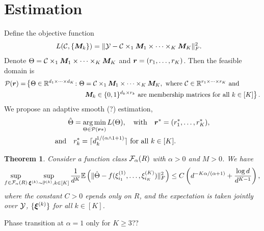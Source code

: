 \documentclass[11pt]{article}
\theoremstyle{plain}
\newtheorem{thm}{Theorem}[section]
\theoremstyle{definition}
\begin{document}
\section{Estimation}
Define the objective function
\begin{align}
L(\mathcal{C}, \{\bm M_k\}) &= \lVert \mathcal{Y}-\mathcal{C}\times_1\bm M_1\times \cdots \times_K \bm M_K\rVert_F^2.
\end{align}
Denote $\Theta =  \mathcal{C}\times_1\bm M_1\times \cdots \times_K \bm M_K$ and $\bm{r}=(r_1,\ldots,r_K)$. Then the feasible domain is
\begin{align}
\mathcal{P}(\bm{r})=& \left\{  \Theta\in\mathbb{R}^{d_1\times \cdots \times d_K} \colon \Theta =  \mathcal{C}\times_1\bm M_1\times \cdots \times_K \bm M_K, \text{ where $\mathcal{C}\in\mathbb{R}^{r_1\times \cdots \times r_K}$ and }\right.\\
& \left.\hspace{1.2in}\bm M_k\in\{0,1\}^{d_k\times r_k} \text{ are membership matrices for all $k\in[K]$}\right\}.
\end{align}
We propose an adaptive smooth (?) estimation, 
\begin{align}
\hat \Theta&=\argmin_{\Theta \in\tP(\mr*)} L(\Theta), \quad \text{with}\quad \mr^*=(r^*_1,\ldots,r^*_K),\\
\text{and}\quad &r^*_k=\lceil d_k^{1/( \alpha\wedge 1+1)}\rceil \ \text{for all $k\in[K]$}.
\end{align}

\begin{thm} Consider a function class $\mathcal{F}_\alpha(R)$ with $\alpha>0$ and $M>0$. We have
\[
\sup_{f \in \mathcal{F}_\alpha(R)}\sup_{\boldsymbol{\xi}^{(k)} \sim \mathbb{P}^{(k)}, k\in[K]}{1\over d^K} \mathbb{E}\left(\lVert\hat \Theta-f(\xi^{(1)}_{i_1},\ldots,\xi^{(K)}_{i_K})\rVert_F^2\right) \leq 
C\left(d^{-K\alpha /( \alpha+1)}+{\log d \over d^{K-1}}\right),
\]
where the constant $C>0$ epends only on $R$, and the expectation is taken jointly over $\mathcal{Y}$, $\{\boldsymbol{\xi}^{(k)}\}$ for all $k\in[K]$.
\end{thm}

{\color{red}Phase transition at $\alpha=1$ only for $K\geq 3$??}


\end{document}
